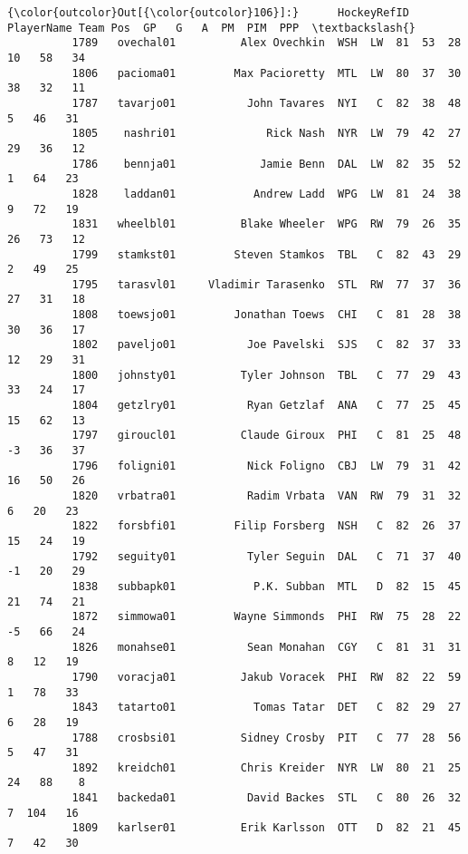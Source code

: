 \documentclass[11pt]{article}
\begin{document}
\begin{Verbatim}[commandchars=\\\{\}]
{\color{outcolor}Out[{\color{outcolor}106}]:}      HockeyRefID             PlayerName Team Pos  GP   G   A  PM  PIM  PPP  \textbackslash{}
          1789   ovechal01          Alex Ovechkin  WSH  LW  81  53  28  10   58   34   
          1806   pacioma01         Max Pacioretty  MTL  LW  80  37  30  38   32   11   
          1787   tavarjo01           John Tavares  NYI   C  82  38  48   5   46   31   
          1805    nashri01              Rick Nash  NYR  LW  79  42  27  29   36   12   
          1786    bennja01             Jamie Benn  DAL  LW  82  35  52   1   64   23   
          1828    laddan01            Andrew Ladd  WPG  LW  81  24  38   9   72   19   
          1831   wheelbl01          Blake Wheeler  WPG  RW  79  26  35  26   73   12   
          1799   stamkst01         Steven Stamkos  TBL   C  82  43  29   2   49   25   
          1795   tarasvl01     Vladimir Tarasenko  STL  RW  77  37  36  27   31   18   
          1808   toewsjo01         Jonathan Toews  CHI   C  81  28  38  30   36   17   
          1802   paveljo01           Joe Pavelski  SJS   C  82  37  33  12   29   31   
          1800   johnsty01          Tyler Johnson  TBL   C  77  29  43  33   24   17   
          1804   getzlry01           Ryan Getzlaf  ANA   C  77  25  45  15   62   13   
          1797   giroucl01          Claude Giroux  PHI   C  81  25  48  -3   36   37   
          1796   foligni01           Nick Foligno  CBJ  LW  79  31  42  16   50   26   
          1820   vrbatra01           Radim Vrbata  VAN  RW  79  31  32   6   20   23   
          1822   forsbfi01         Filip Forsberg  NSH   C  82  26  37  15   24   19   
          1792   seguity01           Tyler Seguin  DAL   C  71  37  40  -1   20   29   
          1838   subbapk01            P.K. Subban  MTL   D  82  15  45  21   74   21   
          1872   simmowa01         Wayne Simmonds  PHI  RW  75  28  22  -5   66   24   
          1826   monahse01           Sean Monahan  CGY   C  81  31  31   8   12   19   
          1790   voracja01          Jakub Voracek  PHI  RW  82  22  59   1   78   33   
          1843   tatarto01            Tomas Tatar  DET   C  82  29  27   6   28   19   
          1788   crosbsi01          Sidney Crosby  PIT   C  77  28  56   5   47   31   
          1892   kreidch01          Chris Kreider  NYR  LW  80  21  25  24   88    8   
          1841   backeda01           David Backes  STL   C  80  26  32   7  104   16   
          1809   karlser01          Erik Karlsson  OTT   D  82  21  45   7   42   30   

\end{Verbatim}
\end{document}
